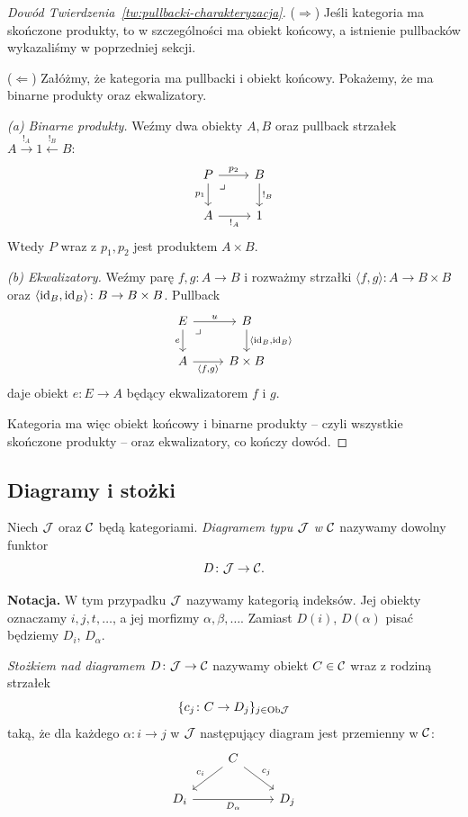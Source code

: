 \begin{proof}[Dowód Twierdzenia~\ref{tw:pullbacki-charakteryzacja}]
($\Rightarrow$) Jeśli kategoria ma skończone produkty, to w szczególności ma obiekt końcowy, a istnienie pullbacków wykazaliśmy w poprzedniej sekcji.

($\Leftarrow$) Załóżmy, że kategoria ma pullbacki i obiekt końcowy. Pokażemy, że ma binarne produkty oraz ekwalizatory.

\emph{(a) Binarne produkty.} Weźmy dwa obiekty $A,B$ oraz pullback strzałek $A\xrightarrow{!_A} 1 \xleftarrow{!_B} B$:
\[
\begin{tikzcd}
P \arrow[r,"p_2"] \arrow[d,"p_1"'] \arrow[dr, phantom, "\lrcorner", very near start] & B \arrow[d,"!_B"] \\
A \arrow[r,"!_A"'] & 1
\end{tikzcd}
\]
Wtedy $P$ wraz z $p_1, p_2$ jest produktem $A\times B$.

\emph{(b) Ekwalizatory.} Weźmy parę $f, g \colon A \to B$ i rozważmy strzałki $\langle f,g\rangle\colon A\to B\times B$ oraz $\langle \mathrm{id}_B, \mathrm{id}_B\rangle\colon B\to B\times B$. Pullback
\[
\begin{tikzcd}
E \arrow[r,"u"] \arrow[d,"e"'] \arrow[dr, phantom, "\lrcorner", very near start] & B \arrow[d,"{\langle \id_B,\id_B\rangle}"] \\
A \arrow[r,"{\langle f,g\rangle}"'] & B\times B
\end{tikzcd}
\]
daje obiekt $e\colon E\to A$ będący ekwalizatorem $f$ i $g$.

Kategoria ma więc obiekt końcowy i binarne produkty -- czyli wszystkie skończone produkty -- oraz ekwalizatory, co kończy dowód.
\end{proof}

\subsection*{Diagramy i stożki}

\begin{definicja}
Niech $\mathcal{J}$ oraz $\mathcal{C}$ będą kategoriami. \emph{Diagramem typu $\mathcal{J}$ w $\mathcal{C}$} nazywamy dowolny funktor
\[
D\colon \mathcal{J}\to \mathcal{C}.
\]
\end{definicja}

\textbf{Notacja.} W tym przypadku $\mathcal{J}$ nazywamy kategorią indeksów. Jej obiekty oznaczamy $i,j,t,\ldots$, a jej morfizmy $\alpha,\beta,\ldots$. Zamiast $D(i)$, $D(\alpha)$ pisać będziemy $D_i$, $D_\alpha$.

\begin{definicja}
\emph{Stożkiem nad diagramem $D\colon \mathcal{J}\to \mathcal{C}$} nazywamy obiekt $C\in \mathcal{C}$ wraz z rodziną strzałek
\[
\{c_j\colon C\to D_j\}_{j\in \mathrm{Ob}\mathcal{J}}
\]
taką, że dla każdego $\alpha\colon i\to j$ w $\mathcal{J}$ następujący diagram jest przemienny w $\mathcal{C}$:
\[
\begin{tikzcd}
& C \arrow[dl,"c_i"'] \arrow[dr,"c_j"] & \\
D_i \arrow[rr,"D_\alpha"'] & & D_j
\end{tikzcd}
\]
\end{definicja}

